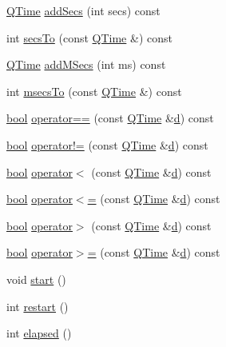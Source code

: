 \begin{DoxyCompactItemize}
\item 
\hyperlink{class_q_time}{Q\+Time} \hyperlink{class_q_time_ab5a97cb2e948c6e16db530d9bbb7a58f}{add\+Secs} (int secs) const 
\item 
int \hyperlink{class_q_time_ae83eafdf47fac8a47dd62ccf5a9c43b4}{secs\+To} (const \hyperlink{class_q_time}{Q\+Time} \&) const 
\item 
\hyperlink{class_q_time}{Q\+Time} \hyperlink{class_q_time_aa0a59e4c2177efe6aa5b789899efc199}{add\+M\+Secs} (int ms) const 
\item 
int \hyperlink{class_q_time_a899f6a5ccad59578249c7717ce5dfcb5}{msecs\+To} (const \hyperlink{class_q_time}{Q\+Time} \&) const 
\item 
\hyperlink{qglobal_8h_a1062901a7428fdd9c7f180f5e01ea056}{bool} \hyperlink{class_q_time_a2c740b95d7538acbf5517f9bb9dd1abb}{operator==} (const \hyperlink{class_q_time}{Q\+Time} \&\hyperlink{060__command__switch_8tcl_af43f4b1f0064a33b2d662af9f06d3a00}{d}) const 
\item 
\hyperlink{qglobal_8h_a1062901a7428fdd9c7f180f5e01ea056}{bool} \hyperlink{class_q_time_ab4a894d47f8baaa5722a3956b2940cc3}{operator!=} (const \hyperlink{class_q_time}{Q\+Time} \&\hyperlink{060__command__switch_8tcl_af43f4b1f0064a33b2d662af9f06d3a00}{d}) const 
\item 
\hyperlink{qglobal_8h_a1062901a7428fdd9c7f180f5e01ea056}{bool} \hyperlink{class_q_time_a01c681d55574f42c9cf4514505018b83}{operator$<$} (const \hyperlink{class_q_time}{Q\+Time} \&\hyperlink{060__command__switch_8tcl_af43f4b1f0064a33b2d662af9f06d3a00}{d}) const 
\item 
\hyperlink{qglobal_8h_a1062901a7428fdd9c7f180f5e01ea056}{bool} \hyperlink{class_q_time_a6fbd9daa542068cccc0a1269dd219af2}{operator$<$=} (const \hyperlink{class_q_time}{Q\+Time} \&\hyperlink{060__command__switch_8tcl_af43f4b1f0064a33b2d662af9f06d3a00}{d}) const 
\item 
\hyperlink{qglobal_8h_a1062901a7428fdd9c7f180f5e01ea056}{bool} \hyperlink{class_q_time_a61553be75cdd1967332cc066a6d2af0d}{operator$>$} (const \hyperlink{class_q_time}{Q\+Time} \&\hyperlink{060__command__switch_8tcl_af43f4b1f0064a33b2d662af9f06d3a00}{d}) const 
\item 
\hyperlink{qglobal_8h_a1062901a7428fdd9c7f180f5e01ea056}{bool} \hyperlink{class_q_time_a59a4ffcbf0aa5d335e8cc42e1c1d82b1}{operator$>$=} (const \hyperlink{class_q_time}{Q\+Time} \&\hyperlink{060__command__switch_8tcl_af43f4b1f0064a33b2d662af9f06d3a00}{d}) const 
\item 
void \hyperlink{class_q_time_aafacb3c8da8d383b7e688f6df20c8835}{start} ()
\item 
int \hyperlink{class_q_time_ae4031d9d548cfa663c03d64ac6eb32f6}{restart} ()
\item 
int \hyperlink{class_q_time_ae6223ec2c678edc4c0b4e8b4d51091c8}{elapsed} ()
\end{DoxyCompactItemize}

